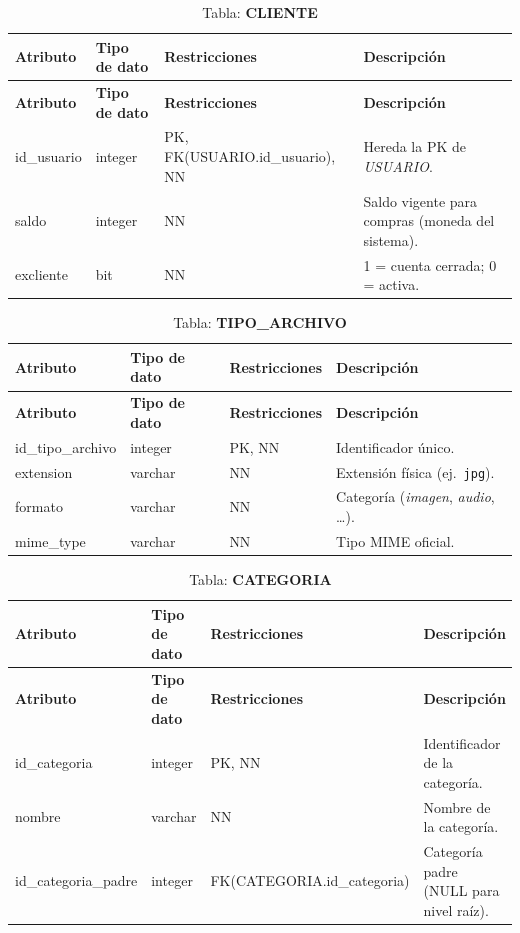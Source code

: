 \begin{longtable}{|l|l|p{5cm}|p{5cm}|}
\caption{Tabla: \textbf{CLIENTE}}\\ \hline
\textbf{Atributo} & \textbf{Tipo de dato} & \textbf{Restricciones} & \textbf{Descripción} \\ \hline
\endfirsthead
\hline \textbf{Atributo} & \textbf{Tipo de dato} & \textbf{Restricciones} & \textbf{Descripción} \\ \hline
\endhead
id\_usuario & integer & PK, FK(USUARIO.id\_usuario), NN & Hereda la PK de \textit{USUARIO}. \\ \hline
saldo       & integer & NN & Saldo vigente para compras (moneda del sistema). \\ \hline
excliente   & bit     & NN & 1 = cuenta cerrada; 0 = activa. \\ \hline
\end{longtable}

\begin{longtable}{|l|l|p{5cm}|p{5cm}|}
\caption{Tabla: \textbf{TIPO\_ARCHIVO}}\\ \hline
\textbf{Atributo} & \textbf{Tipo de dato} & \textbf{Restricciones} & \textbf{Descripción} \\ \hline
\endfirsthead
\hline \textbf{Atributo} & \textbf{Tipo de dato} & \textbf{Restricciones} & \textbf{Descripción} \\ \hline
\endhead
id\_tipo\_archivo & integer & PK, NN & Identificador único. \\ \hline
extension         & varchar & NN     & Extensión física (ej.\ \texttt{jpg}). \\ \hline
formato           & varchar & NN     & Categoría (\textit{imagen}, \textit{audio}, …). \\ \hline
mime\_type        & varchar & NN     & Tipo MIME oficial. \\ \hline
\end{longtable}

\begin{longtable}{|l|l|p{5cm}|p{5cm}|}
\caption{Tabla: \textbf{CATEGORIA}}\\ \hline
\textbf{Atributo} & \textbf{Tipo de dato} & \textbf{Restricciones} & \textbf{Descripción} \\ \hline
\endfirsthead
\hline \textbf{Atributo} & \textbf{Tipo de dato} & \textbf{Restricciones} & \textbf{Descripción} \\ \hline
\endhead
id\_categoria       & integer & PK, NN & Identificador de la categoría. \\ \hline
nombre              & varchar & NN     & Nombre de la categoría. \\ \hline
id\_categoria\_padre & integer & FK(CATEGORIA.id\_categoria) & Categoría padre (NULL para nivel raíz). \\ \hline
\end{longtable}

